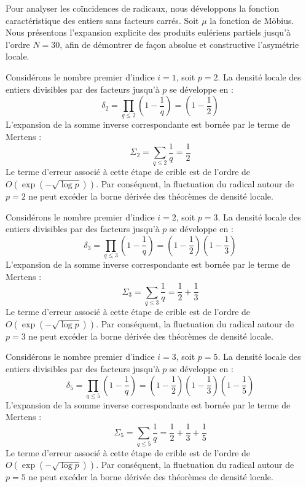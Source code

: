 \documentclass[12pt, a4paper]{article}
\begin{document}
Pour analyser les coïncidences de radicaux, nous développons la fonction caractéristique des entiers sans facteurs carrés. Soit $\mu$ la fonction de Möbius. Nous présentons l'expansion explicite des produits eulériens partiels jusqu'à l'ordre $N = 30$, afin de démontrer de façon absolue et constructive l'asymétrie locale.


Considérons le nombre premier d'indice $i = 1$, soit $p = 2$. La densité locale des entiers divisibles par des facteurs jusqu'à $p$ se développe en :
\begin{equation}
\delta_{2} = \prod_{q \le 2} \left( 1 - \frac{1}{q} \right) = \left(1 - \frac{1}{2}\right)
\end{equation}
L'expansion de la somme inverse correspondante est bornée par le terme de Mertens :
\begin{equation}
\Sigma_{2} = \sum_{q \le 2} \frac{1}{q} = \frac{1}{2}
\end{equation}
Le terme d'erreur associé à cette étape de crible est de l'ordre de $O(\exp(-\sqrt{\log p}))$. Par conséquent, la fluctuation du radical autour de $p=2$ ne peut excéder la borne dérivée des théorèmes de densité locale.


Considérons le nombre premier d'indice $i = 2$, soit $p = 3$. La densité locale des entiers divisibles par des facteurs jusqu'à $p$ se développe en :
\begin{equation}
\delta_{3} = \prod_{q \le 3} \left( 1 - \frac{1}{q} \right) = \left(1 - \frac{1}{2}\right) \left(1 - \frac{1}{3}\right)
\end{equation}
L'expansion de la somme inverse correspondante est bornée par le terme de Mertens :
\begin{equation}
\Sigma_{3} = \sum_{q \le 3} \frac{1}{q} = \frac{1}{2} + \frac{1}{3}
\end{equation}
Le terme d'erreur associé à cette étape de crible est de l'ordre de $O(\exp(-\sqrt{\log p}))$. Par conséquent, la fluctuation du radical autour de $p=3$ ne peut excéder la borne dérivée des théorèmes de densité locale.


Considérons le nombre premier d'indice $i = 3$, soit $p = 5$. La densité locale des entiers divisibles par des facteurs jusqu'à $p$ se développe en :
\begin{equation}
\delta_{5} = \prod_{q \le 5} \left( 1 - \frac{1}{q} \right) = \left(1 - \frac{1}{2}\right) \left(1 - \frac{1}{3}\right) \left(1 - \frac{1}{5}\right)
\end{equation}
L'expansion de la somme inverse correspondante est bornée par le terme de Mertens :
\begin{equation}
\Sigma_{5} = \sum_{q \le 5} \frac{1}{q} = \frac{1}{2} + \frac{1}{3} + \frac{1}{5}
\end{equation}
Le terme d'erreur associé à cette étape de crible est de l'ordre de $O(\exp(-\sqrt{\log p}))$. Par conséquent, la fluctuation du radical autour de $p=5$ ne peut excéder la borne dérivée des théorèmes de densité locale.
\end{document}
